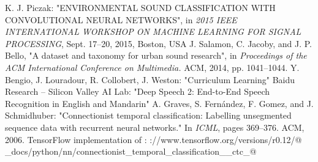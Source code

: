 \documentclass[utf-8]{article}
\begin{document}
\begin{thebibliography}{5}
 K. J. Piczak: "ENVIRONMENTAL SOUND CLASSIFICATION
WITH CONVOLUTIONAL NEURAL NETWORKS", in \textit{2015 IEEE INTERNATIONAL WORKSHOP ON MACHINE LEARNING FOR SIGNAL PROCESSING}, Sept. 17–20, 2015, Boston, USA
 J. Salamon, C. Jacoby, and J. P. Bello, "A dataset and
taxonomy for urban sound research", in \textit{Proceedings
of the ACM International Conference on Multimedia.}
ACM, 2014, pp. 1041–1044.
 Y. Bengio, J. Louradour, R. Collobert, J. Weston: "Curriculum Learning"
 Baidu Research – Silicon Valley AI Lab: "Deep Speech 2: End-to-End Speech Recognition in
English and Mandarin"
 A. Graves, S. Fernández, F. Gomez, and J. Schmidhuber: "Connectionist temporal classification: Labelling
unsegmented sequence data with recurrent neural networks." In \textit{ICML}, pages 369–376. ACM, 2006.
 TensorFlow implementation of \cite{ctc}:  
\verb@https://www.tensorflow.org/versions/r0.12/@\\
\verb@api_docs/python/nn/connectionist_temporal_classification__ctc_@ 
\end{thebibliography}
\end{document}
